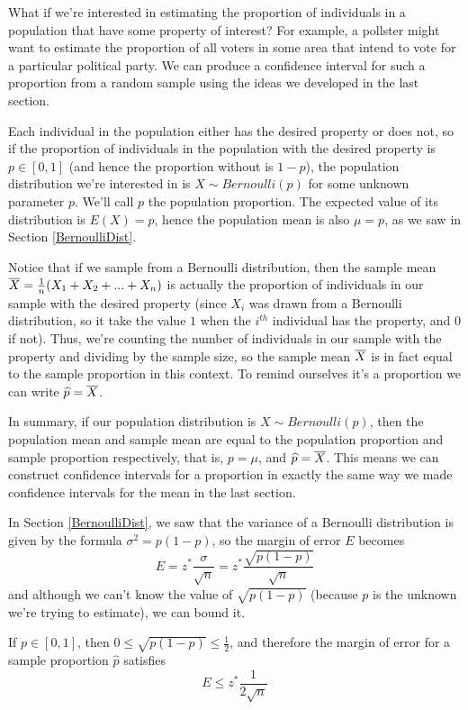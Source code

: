 What if we're interested in estimating the proportion of individuals in a population that have some property of interest? For example, a pollster might want to estimate the proportion of all voters in some area that intend to vote for a particular political party. We can produce a confidence interval for such a proportion from a random sample using the ideas we developed in the last section.
\par
Each individual in the population either has the desired property or does not, so if the proportion of individuals in the population with the desired property is $p \in [0,1]$ (and hence the proportion without is $1-p$), the population distribution we're interested in is $X \sim Bernoulli(p)$ for some unknown parameter $p$. We'll call $p$ the population proportion. The expected value of its distribution is $E(X) = p$, hence the population mean is also $\mu = p$, as we saw in Section \ref{BernoulliDist}.
\par
Notice that if we sample from a Bernoulli distribution, then the sample mean ${\overline{X}} = \frac{1}{n}(X_1+X_2+...+X_n)$ is actually the proportion of individuals in our sample with the desired property (since $X_i$ was drawn from a Bernoulli distribution, so it take the value $1$ when the $i^{th}$ individual has the property, and $0$ if not). Thus, we're counting the number of individuals in our sample with the property and dividing by the sample size, so the sample mean ${\overline{X}}$ is in fact equal to the sample proportion in this context. To remind ourselves it's a proportion we can write $\widehat{p} = {\overline{X}}$.
\par
In summary, if our population distribution is $X \sim Bernoulli(p)$, then the population mean and sample mean are equal to the population proportion and sample proportion respectively, that is, $p = \mu$, and $\widehat{p}={\overline{X}}$. This means we can construct confidence intervals for a proportion in exactly the same way we made confidence intervals for the mean in the last section.
\par
In Section \ref{BernoulliDist}, we saw that the variance of a Bernoulli distribution is given by the formula $\sigma^2 = p(1-p)$, so the margin of error $E$ becomes
$$E = z^*  \frac{\sigma}{\sqrt{n}} = z^*  \frac{\sqrt{p(1-p)}}{\sqrt{n}}$$
and although we can't know the value of $\sqrt{p(1-p)}$ (because $p$ is the unknown we're trying to estimate), we can bound it.
\begin{prop} If $p \in [0,1]$, then $0 \leq \sqrt{p(1-p)} \leq \frac{1}{2}$, and therefore the margin of error for a sample proportion $\widehat{p}$ satisfies
$$\boxed{E \leq z^*  \frac{1}{2\sqrt{n}}}$$
\end{prop}
